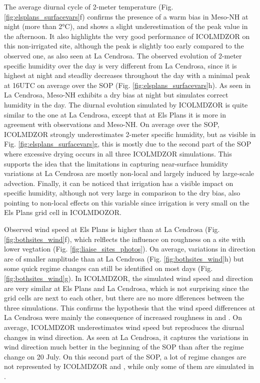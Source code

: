The average diurnal cycle of 2-meter temperature (Fig. \ref{fig:elsplans_surfacevars}f) confirms the presence of a warm bias in Meso-NH at night (more than 2°C), and shows a slight underestimation of the peak value in the afternoon. 
It also highlights the very good performance of ICOLMDZOR on this non-irrigated site, although the peak is slightly too early compared to the observed one, as also seen at La Cendrosa.
The observed evolution of 2-meter specific humidity over the day is very different from La Cendrosa, since it is highest at night and steadliy decreases throughout the day with a minimal peak at 16UTC on average over the SOP (Fig. \ref{fig:elsplans_surfacevars}h).
As seen in La Cendrosa, Meso-NH exhibits a dry bias at night but simulates correct humidity in the day. 
The diurnal evolution simulated by ICOLMDZOR is quite similar to the one at La Cendrosa, except that at Els Plans it is more in agreement with observations and Meso-NH. On average over the SOP, ICOLMDZOR strongly underestimates 2-meter specific humidity, but as visible in Fig. \ref{fig:elsplans_surfacevars}g, this is mostly due to the second part of the SOP where excessive drying occurs in all three ICOLMDZOR simulations. 
This supports the idea that the limitations in capturing near-surface humidity variations at La Cendrosa are mostly non-local and largely induced by large-scale advection. 
Finally, it can be noticed that irrigation has a visible impact on specific humidity, although not very large in comparison to the dry bias, also pointing to non-local effects on this variable since irrigation is very small on the Els Plans grid cell in ICOLMDOZOR.%

Observed wind speed at Els Plans is higher than at La Cendrosa (Fig. \ref{fig:bothsites_wind}f), which relflects the influence on roughness on a site with lower vegtation (Fig. \ref{fig:liaise_sites_photos}). On average, variations in direction are of smaller amplitude than at La Cendrosa (Fig. \ref{fig:bothsites_wind}h) but some quick regime changes can still be identified on most days (Fig. \ref{fig:bothsites_wind}g).
In ICOLMDZOR, the simulated wind speed and direction are very similar at Els Plans and La Cendrosa, which is not surprising since the grid cells are next to each other, but there are no more dfferences between the three simulations. This confirms the hypothesis that the wind speed differences at La Cendrosa were mainly the consequence of increased roughness in \irrboost and \irr. On average, ICOLMDZOR underestimates wind speed but reproduces the diurnal changes in wind direction. As seen at La Cendrosa, it captures the variations in wind direction much better in the beginning of the SOP than after the regime change on 20 July. On this second part of the SOP, a lot of regime changes are not represented by ICOLMDZOR and \mesomean, while only some of them are simulated in \mesoexact.

